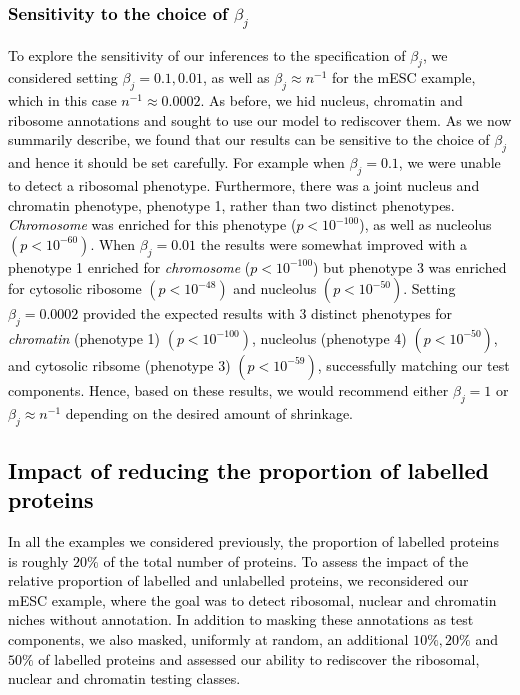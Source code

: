 \documentclass[12pt,english]{article}
\begin{document}
\textcolor{black}{ 
\subsubsection{Sensitivity to the choice of $\beta_j$}
To explore the sensitivity of our inferences to the specification of $\beta_j$, we considered setting $\beta_j = 0.1,0.01$, as well as $\beta_j \approx n^{-1}$ for the mESC example, which in this case $n^{-1} \approx 0.0002$. As before, we hid nucleus, chromatin and ribosome annotations and sought to use our model to rediscover them. As we now summarily describe, we found that our results can be sensitive to the choice of $\beta_j$ and hence it should be set carefully. For example when $\beta_j = 0.1$, we were unable to detect a ribosomal phenotype. Furthermore, there was a joint nucleus and chromatin phenotype, phenotype 1, rather than two distinct phenotypes.  \textit{Chromosome} was enriched for this phenotype ($p < 10^{-100}$), as well as nucleolus $(p < 10^{-60})$. When $\beta_j = 0.01$ the results were somewhat improved with a phenotype 1 enriched for \textit{chromosome} ($p < 10^{-100}$) but phenotype 3 was enriched for cytosolic ribosome $(p < 10^{-48})$ and nucleolus $(p < 10^{-50})$. Setting $\beta_j = 0.0002$ provided the expected results with 3 distinct phenotypes for \textit{chromatin} (phenotype 1) $(p < 10^{-100})$, nucleolus (phenotype 4) $(p < 10^{-50})$, and cytosolic ribsome (phenotype 3) $(p < 10^{-59})$, successfully matching our test components. Hence, based on these results, we would recommend either $\beta_j = 1$ or $\beta_j \approx n^{-1}$ depending on the desired amount of shrinkage. 
}
\textcolor{black}{ 
\subsection{Impact of reducing the proportion of labelled proteins} \label{section:unsuper}
In all the examples we considered previously, the proportion of labelled proteins is roughly $20\%$ of the total number of proteins. %
  To assess the impact of the relative proportion of labelled and unlabelled proteins, we reconsidered our mESC example, where the goal was to detect ribosomal, nuclear and chromatin niches without annotation. In addition to masking these annotations as test components, we also masked, uniformly at random, an additional $10\%,20\%$ and $50\%$ of labelled proteins and assessed our ability to rediscover the ribosomal, nuclear and chromatin testing classes.
}
\end{document}
